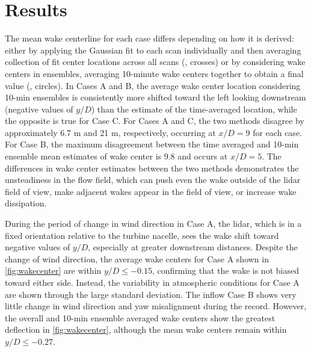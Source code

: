 \documentclass[aip,amsmath,amssymb,preprint,]{revtex4-1}
\begin{document}


\section{Results} %
\label{sec:Results}

The mean wake centerline for each case differs depending on how it is derived: either by applying the Gaussian fit to each scan individually and then averaging collection of fit center locations across all scans (, crosses) or by considering wake centers in  ensembles, averaging 10-minute wake centers together to obtain a final value (, circles).  
In Cases A and B, the average wake center location considering 10-min ensembles is consistently more shifted toward the left looking downstream (negative values of $y/D$) than the estimate of the time-averaged location, while the opposite is true for Case C. For Cases A and C, the two methods disagree by approximately 6.7 m and 21 m, respectively, occurring at $x/D=9$ for each case.
For Case B, the maximum disagreement between the time averaged and 10-min ensemble mean estimates of wake center is 9.8 and occurs at $x/D=5$.
The differences in wake center estimates between the two methods demonstrates the unsteadiness in the flow field, which can push even the wake outside of the lidar field of view, make adjacent wakes appear in the field of view, or increase wake dissipation. 

During the period of change in wind direction in Case A, the lidar, which is in a fixed orientation relative to the turbine nacelle, sees the wake shift toward negative values of $y/D$, especially at greater downstream distances.
Despite the change of wind direction, the average wake centers for Case A shown in \cref{fig:wakecenter} are within $y/D \le -0.15$, confirming that the wake is not biased toward either side.
Instead, the variability in atmospheric conditions for Case A are shown through the large standard deviation.
The inflow Case B shows very little change in wind direction and yaw misalignment during the record.
However, the overall and 10-min ensemble averaged wake centers show the greatest deflection in \cref{fig:wakecenter}, although the mean wake centers remain within $y/D \le -0.27$.
\end{document}
